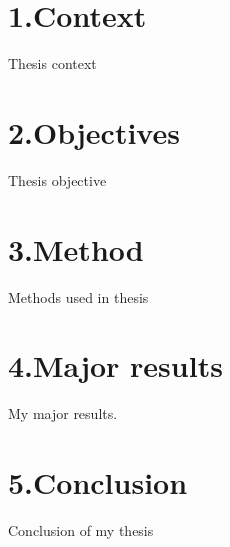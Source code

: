 
\section*{1.\quad Context}
Thesis context

\section*{2.\quad Objectives}

Thesis objective 

\section*{3.\quad Method}
Methods used in thesis

\section*{4.\quad Major results}
My major results.

\section*{5.\quad Conclusion}
Conclusion of my thesis
